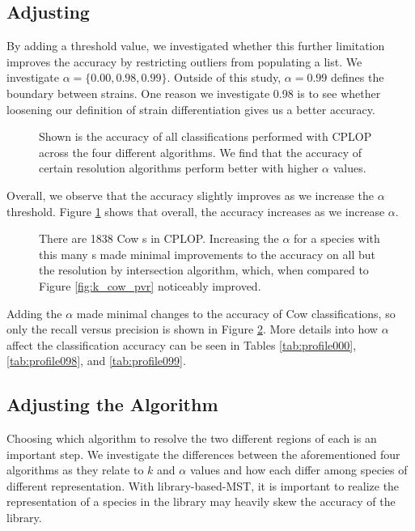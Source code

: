 \subsection{Adjusting \a{}}
By adding a threshold value, we investigated whether this further limitation improves the accuracy by restricting outliers from populating a \knn{} list. We investigate $\alpha = \{0.00,0.98,0.99\}$. Outside of this study, $\alpha = 0.99$ defines the boundary between strains. One reason we investigate 0.98 is to see whether loosening our definition of strain differentiation gives us a better accuracy.

\begin{figure}[t]
\centering
{}
\caption{Shown is the accuracy of all classifications performed with CPLOP across the four different algorithms. We find that the accuracy of certain resolution algorithms perform better with higher $\alpha$ values.}
\label{fig:alpha_overall}
\end{figure}

Overall, we observe that the accuracy slightly improves as we increase the $\alpha$ threshold. Figure \ref{fig:alpha_overall} shows that overall, the accuracy increases as we increase $\alpha$. 


\begin{figure}[t]
\centering
{}
\caption{There are 1838 Cow \isol{}s in CPLOP. Increasing the $\alpha$ for a species with this many \isol{}s made minimal improvements to the accuracy on all but the resolution by intersection algorithm, which, when compared to Figure \ref{fig:k_cow_pvr} noticeably improved.}
\label{fig:alpha_cow_pvr}
\end{figure}

Adding the $\alpha$ made minimal changes to the accuracy of Cow classifications, so only the recall versus precision is shown in Figure \ref{fig:alpha_cow_pvr}. More details into how $\alpha$ affect the classification accuracy can be seen in Tables \ref{tab:profile000}, \ref{tab:profile098}, and \ref{tab:profile099}.

\subsection{Adjusting the Algorithm}
Choosing which algorithm to resolve the two different regions of each \isol{} is an important step. We investigate the differences between the aforementioned four algorithms as they relate to $k$ and $\alpha$ values and how each differ among species of different representation. With library-based-MST, it is important to realize the representation of a species in the library may heavily skew the accuracy of the library.

